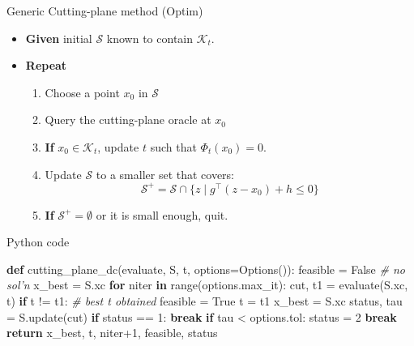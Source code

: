 \documentclass[10pt,ignorenonframetext,serif,onlymath]{beamer}
\newenvironment{Shaded}{}{}
\newcommand{\BuiltInTok}[1]{#1}
\newcommand{\CommentTok}[1]{\textcolor[rgb]{0.38,0.63,0.69}{\textit{#1}}}
\newcommand{\ControlFlowTok}[1]{\textcolor[rgb]{0.00,0.44,0.13}{\textbf{#1}}}
\newcommand{\DecValTok}[1]{\textcolor[rgb]{0.25,0.63,0.44}{#1}}
\newcommand{\KeywordTok}[1]{\textcolor[rgb]{0.00,0.44,0.13}{\textbf{#1}}}
\newcommand{\NormalTok}[1]{#1}
\newcommand{\OperatorTok}[1]{\textcolor[rgb]{0.40,0.40,0.40}{#1}}
\newcommand{\VariableTok}[1]{\textcolor[rgb]{0.10,0.09,0.49}{#1}}
\providecommand{\tightlist}{%
  \setlength{\itemsep}{0pt}\setlength{\parskip}{0pt}}
\begin{document}
\begin{frame}{Generic Cutting-plane method (Optim)}
\protect\hypertarget{sec:generic-cutting-plane-method-optim}{}

\begin{itemize}
\tightlist
\item
  \textbf{Given} initial \(\mathcal{S}\) known to contain
  \(\mathcal{K}_t\).
\item
  \textbf{Repeat}

  \begin{enumerate}
  [1.]
  \tightlist
  \item
    Choose a point \(x_0\) in \(\mathcal{S}\)
  \item
    Query the cutting-plane oracle at \(x_0\)
  \item
    \textbf{If} \(x_0 \in \mathcal{K}_t\), update \(t\) such that
    \(\Phi_t(x_0) = 0\).
  \item
    Update \(\mathcal{S}\) to a smaller set that covers:
    \[\mathcal{S}^+ = \mathcal{S} \cap \{z \mid g^\top (z - x_0) + h \leq 0\} \]
  \item
    \textbf{If} \(\mathcal{S}^+ = \emptyset\) or it is small enough,
    quit.
  \end{enumerate}
\end{itemize}

\end{frame}

\begin{frame}[fragile]{Python code}
\protect\hypertarget{sec:python-code-2}{}

\begin{Shaded}
\begin{Highlighting}[]
\KeywordTok{def}\NormalTok{ cutting_plane_dc(evaluate, S, t, options}\OperatorTok{=}\NormalTok{Options()):}
\NormalTok{    feasible }\OperatorTok{=} \VariableTok{False}  \CommentTok{# no sol'n}
\NormalTok{    x_best }\OperatorTok{=}\NormalTok{ S.xc}
    \ControlFlowTok{for}\NormalTok{ niter }\KeywordTok{in} \BuiltInTok{range}\NormalTok{(options.max_it):}
\NormalTok{        cut, t1 }\OperatorTok{=}\NormalTok{ evaluate(S.xc, t)}
        \ControlFlowTok{if}\NormalTok{ t }\OperatorTok{!=}\NormalTok{ t1:  }\CommentTok{# best t obtained}
\NormalTok{            feasible }\OperatorTok{=} \VariableTok{True}
\NormalTok{            t }\OperatorTok{=}\NormalTok{ t1}
\NormalTok{            x_best }\OperatorTok{=}\NormalTok{ S.xc}
\NormalTok{        status, tau }\OperatorTok{=}\NormalTok{ S.update(cut)}
        \ControlFlowTok{if}\NormalTok{ status }\OperatorTok{==} \DecValTok{1}\NormalTok{:}
            \ControlFlowTok{break}
        \ControlFlowTok{if}\NormalTok{ tau }\OperatorTok{<}\NormalTok{ options.tol:}
\NormalTok{            status }\OperatorTok{=} \DecValTok{2}
            \ControlFlowTok{break}
    \ControlFlowTok{return}\NormalTok{ x_best, t, niter}\OperatorTok{+}\DecValTok{1}\NormalTok{, feasible, status}
\end{Highlighting}
\end{Shaded}

\end{frame}
\end{document}
